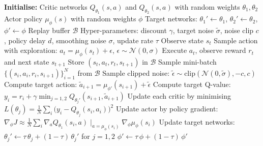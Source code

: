 \begin{algorithmic}
\State \textbf{Initialise:}
\State \quad Critic networks $Q_{\theta_1}(s,a)$ and $Q_{\theta_2}(s,a)$ with random weights $\theta_1,\theta_2$
\State \quad Actor policy $\mu_{\phi}(s)$ with random weights $\phi$
\State \quad Target networks: $\theta_1' \leftarrow \theta_1$, $\theta_2' \leftarrow \theta_2$, $\phi' \leftarrow \phi$
\State \quad Replay buffer $\mathcal{B}$
\State \quad Hyper-parameters: discount $\gamma$, target noise $\tilde{\sigma}$, noise clip $c$, policy delay $d$, smoothing noise $\sigma$, update rate $\tau$
    \State Observe state $s_t$
    \State Sample action with exploration: $a_t = \mu_{\phi}(s_t) + \epsilon$, $\epsilon \sim \mathcal{N}(0,\sigma)$
    \State Execute $a_t$, observe reward $r_t$ and next state $s_{t+1}$
    \State Store $(s_t, a_t, r_t, s_{t+1})$ in $\mathcal{B}$
    \State Sample mini-batch $\{(s_i,a_i,r_i,s_{i+1})\}_{i=1}^N$ from $\mathcal{B}$
    \State \quad Sample clipped noise: $\tilde{\epsilon} \sim \mathrm{clip}(\mathcal{N}(0,\tilde{\sigma}), -c, c)$
    \State \quad Compute target action: $\tilde{a}_{i+1} = \mu_{\phi'}(s_{i+1}) + \tilde{\epsilon}$
    \State \quad Compute target Q-value:
        $y_i = r_i + \gamma \min_{j=1,2} Q_{\theta_j'}(s_{i+1}, \tilde{a}_{i+1})$
    \State \quad Update each critic by minimising
        $L(\theta_j) = \frac{1}{N}\sum_i \bigl(y_i - Q_{\theta_j}(s_i,a_i)\bigr)^2$
        \State Update actor by policy gradient: $\nabla_{\phi} J \approx \frac{1}{N}\sum_i \nabla_a Q_{\theta_1}(s_i,a)\mid_{a=\mu_{\phi}(s_i)} \nabla_{\phi} \mu_{\phi}(s_i)$
        \State Update target networks:
        \State \quad $\theta_j' \leftarrow \tau\,\theta_j + (1-\tau)\,\theta_j'$ \hfill for $j=1,2$
        \State \quad $\phi' \leftarrow \tau\,\phi + (1-\tau)\,\phi'$
    \EndIf
\EndFor
\end{algorithmic}